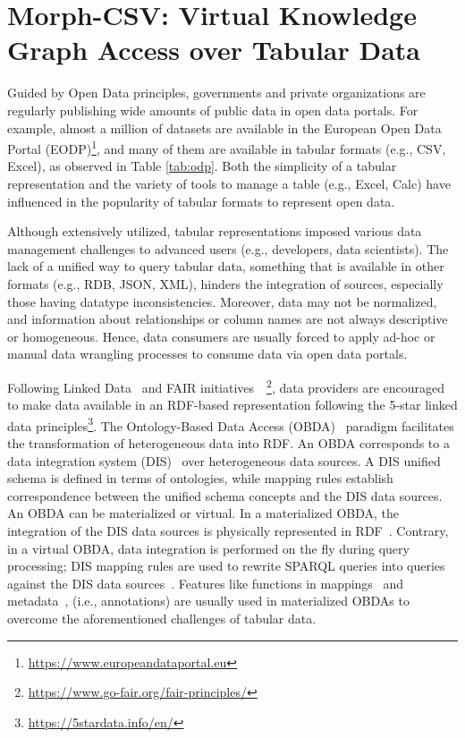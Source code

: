\section{Morph-CSV: Virtual Knowledge Graph Access over Tabular Data}

Guided by Open Data principles, governments and private organizations are regularly publishing wide amounts of public data in open data portals. For example, almost a million of datasets are available in the European Open Data Portal (EODP)\footnote{\url{https://www.europeandataportal.eu}}, and many of them are available in tabular formats (e.g., CSV, Excel), as observed in Table \ref{tab:odp}. Both the simplicity of a tabular representation and the variety of tools to manage a table (e.g., Excel, Calc) have influenced in the popularity of tabular formats to represent open data.  

Although extensively utilized, tabular representations imposed various data management challenges to advanced users (e.g., developers, data scientists). The lack of a unified way to query tabular data, something that is available in other formats (e.g., RDB, JSON, XML), hinders the integration of sources, especially those having datatype inconsistencies. Moreover, data may not be normalized, and information about relationships or column names are not always descriptive or homogeneous. Hence, data consumers are usually forced to apply ad-hoc or manual data wrangling processes to consume data via open data portals. 

Following Linked Data~\citep{bizer2011linked} and FAIR initiatives~\citep{wilkinson2016fair}~\footnote{\url{https://www.go-fair.org/fair-principles/}}, data providers are encouraged to make data available in an RDF-based representation following the 5-star linked data principles\footnote{\url{https://5stardata.info/en/}}. The Ontology-Based Data Access (OBDA)~\citep{poggi2008linking} paradigm facilitates the transformation of heterogeneous data into RDF.
An OBDA corresponds to a data integration system (DIS)~\citep{Lenzerini02} over heterogeneous data sources. A DIS unified schema is defined in terms of ontologies, while mapping rules establish correspondence between the unified schema concepts and the DIS data sources. An OBDA can be materialized or virtual. In a materialized OBDA, the integration of the DIS data sources is physically represented in RDF~\citep{poggi2008linking}. Contrary, in a virtual OBDA, data integration is performed on the fly during query processing; DIS mapping rules are used to rewrite SPARQL queries into queries against the DIS data sources~\citep{calvanese2017ontop,priyatna2014formalisation}.
Features like functions in mappings~\citep{de2017declarative,junior2016funul} and metadata~\citep{tennison2015model}, (i.e., annotations) are usually used in materialized OBDAs to overcome the aforementioned challenges of tabular data.

